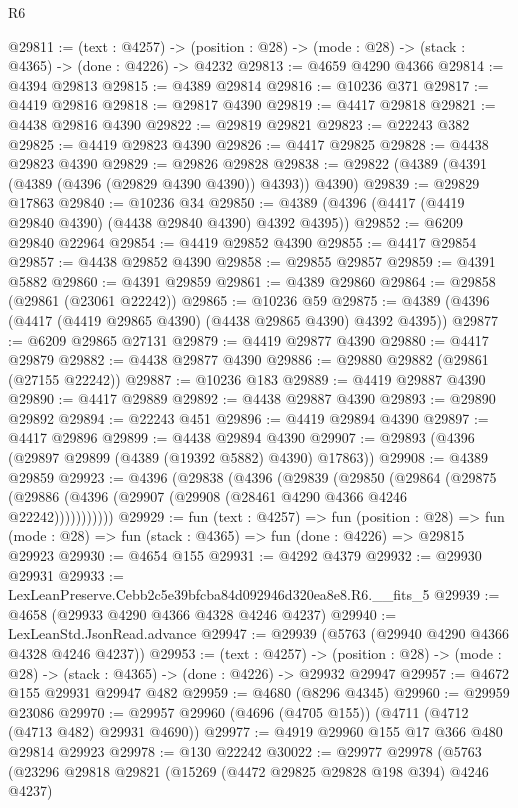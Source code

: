 \begin{lexlean}{R6}
\begin{coremodule}
@29811 := (text : @4257) ->
  (position : @28) -> (mode : @28) -> (stack : @4365) -> (done : @4226) -> @4232
@29813 := @4659 @4290 @4366
@29814 := @4394 @29813
@29815 := @4389 @29814
@29816 := @10236 @371
@29817 := @4419 @29816
@29818 := @29817 @4390
@29819 := @4417 @29818
@29821 := @4438 @29816 @4390
@29822 := @29819 @29821
@29823 := @22243 @382
@29825 := @4419 @29823 @4390
@29826 := @4417 @29825
@29828 := @4438 @29823 @4390
@29829 := @29826 @29828
@29838 := @29822 (@4389 (@4391 (@4389 (@4396 (@29829 @4390 @4390)) @4393)) @4390)
@29839 := @29829 @17863
@29840 := @10236 @34
@29850 := @4389 (@4396 (@4417 (@4419 @29840 @4390) (@4438 @29840 @4390) @4392 @4395))
@29852 := @6209 @29840 @22964
@29854 := @4419 @29852 @4390
@29855 := @4417 @29854
@29857 := @4438 @29852 @4390
@29858 := @29855 @29857
@29859 := @4391 @5882
@29860 := @4391 @29859
@29861 := @4389 @29860
@29864 := @29858 (@29861 (@23061 @22242))
@29865 := @10236 @59
@29875 := @4389 (@4396 (@4417 (@4419 @29865 @4390) (@4438 @29865 @4390) @4392 @4395))
@29877 := @6209 @29865 @27131
@29879 := @4419 @29877 @4390
@29880 := @4417 @29879
@29882 := @4438 @29877 @4390
@29886 := @29880 @29882 (@29861 (@27155 @22242))
@29887 := @10236 @183
@29889 := @4419 @29887 @4390
@29890 := @4417 @29889
@29892 := @4438 @29887 @4390
@29893 := @29890 @29892
@29894 := @22243 @451
@29896 := @4419 @29894 @4390
@29897 := @4417 @29896
@29899 := @4438 @29894 @4390
@29907 := @29893 (@4396 (@29897 @29899 (@4389 (@19392 @5882) @4390) @17863))
@29908 := @4389 @29859
@29923 := @4396
    (@29838
      (@4396
        (@29839
          (@29850
            (@29864
              (@29875 (@29886 (@4396 (@29907 (@29908 (@28461 @4290 @4366 @4246 @22242)))))))))))
@29929 := fun (text : @4257) =>
  fun (position : @28) =>
  fun (mode : @28) => fun (stack : @4365) => fun (done : @4226) => @29815 @29923
@29930 := @4654 @155
@29931 := @4292 @4379
@29932 := @29930 @29931
@29933 := LexLeanPreserve.Cebb2c5e39bfcba84d092946d320ea8e8.R6.__fits_5
@29939 := @4658 (@29933 @4290 @4366 @4328 @4246 @4237)
@29940 := LexLeanStd.JsonRead.advance
@29947 := @29939 (@5763 (@29940 @4290 @4366 @4328 @4246 @4237))
@29953 := (text : @4257) ->
  (position : @28) -> (mode : @28) -> (stack : @4365) -> (done : @4226) -> @29932 @29947
@29957 := @4672 @155 @29931 @29947 @482
@29959 := @4680 (@8296 @4345)
@29960 := @29959 @23086
@29970 := @29957 @29960 (@4696 (@4705 @155)) (@4711 (@4712 (@4713 @482) @29931 @4690))
@29977 := @4919 @29960 @155 @17 @366 @480 @29814 @29923
@29978 := @130 @22242
@30022 := @29977
    @29978
    (@5763
      (@23296
        @29818
        @29821
        (@15269 (@4472 @29825 @29828 @198 @394) @4246 @4237)

\end{coremodule}
\end{lexlean}
